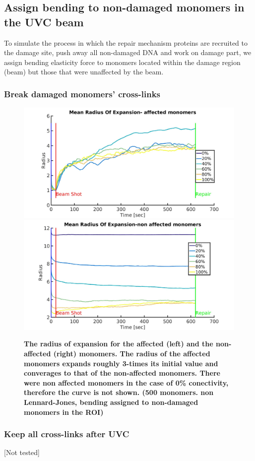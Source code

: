 \documentclass[12pt]{report}
\begin{document}
    
	\subsection{Assign bending to non-damaged monomers in the UVC beam}	
	 To simulate the process in which the repair mechanism proteins are recruited to the damage site, push away all non-damaged DNA and work on damage part, we assign bending elasticity force to monomers located within the damage region (beam) but those that were unaffected by the beam.
	 \subsubsection{Break damaged monomers' cross-links}
	 
	 
	\begin{figure}[H]
	\includegraphics[width=0.5\linewidth, height=0.3\textheight]{Images/expandNonDamagedInBeam/breakDamagedCrosslinks/meanRadiusOfExpansionAffected}
	\includegraphics[width=0.5\linewidth, height=0.3\textheight]{Images/expandNonDamagedInBeam/breakDamagedCrosslinks/meanRadiusOfExpansionNonAffected}
	\caption{\tiny{\textbf{The radius of expansion for the affected (left) and the non-affected (right) monomers. The radius of the affected monomers expands roughly 3-times its initial value and converages to that of the non-affected monomers. There were non affected monomers in the case of 0\% conectivity, therefore the curve is not shown. (500 monomers. non Lennard-Jones, bending assigned to non-damaged monomers in the ROI)}}}
	\label{fig:meanRadiusOfExpansionAffected}
	\end{figure}
	 
	 \subsubsection{Keep all cross-links after UVC}
	 [Not tested]
\end{document}
